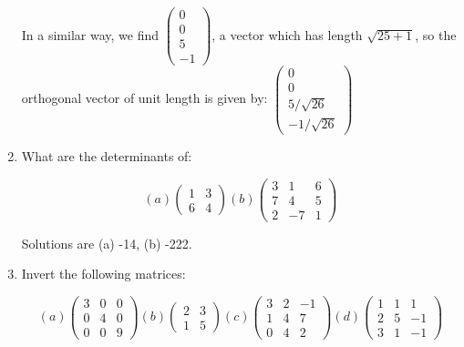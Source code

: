 \documentclass{article}
\begin{document}
\begin{enumerate}
In a similar way, we find $\left( \begin{array}{r} 0 \\ 0 \\ 5 \\ -1 \end{array} \right)$, a vector which has length $\sqrt{25+1}$, so the orthogonal vector of unit length is given by:  $\left( \begin{array}{r} 0 \\ 0 \\ 5/\sqrt{26} \\ -1/\sqrt{26} \end{array} \right)$

\item What are the determinants of:

\begin{displaymath}
(a) \left( \begin{array}{rr} 1 & 3 \\ 6 & 4 \end{array} \right)
(b) \left( \begin{array}{rrr} 3 & 1 & 6 \\ 7 & 4 & 5 \\ 2 & -7 & 1 \end{array} \right)
\end{displaymath}

Solutions are (a) -14, (b) -222.

\item Invert the following matrices:

\begin{displaymath}
(a) \left( \begin{array}{rrr} 3 & 0 & 0 \\ 0 & 4 & 0 \\ 0 & 0 & 9 \end{array} \right)
(b) \left( \begin{array}{rr} 2 & 3 \\ 1 & 5  \end{array} \right)
(c) \left( \begin{array}{rrr} 3 & 2 & -1 \\ 1 & 4 & 7 \\ 0 & 4 & 2 \end{array} \right)
(d) \left( \begin{array}{rrr} 1 & 1 & 1 \\ 2 & 5 & -1 \\ 3 & 1 & -1 \end{array} \right)
\end{displaymath}


\end{enumerate}
\end{document}
